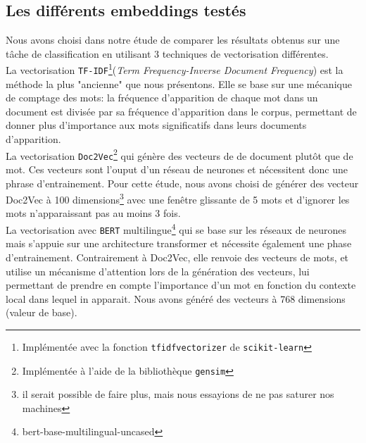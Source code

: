 \subsection{Les différents embeddings testés}
Nous avons choisi dans notre étude de comparer les résultats obtenus sur une tâche 
de classification en utilisant 3 techniques de vectorisation différentes.\\
\indent La vectorisation \texttt{TF-IDF}\footnote{Implémentée avec la fonction \texttt{tfidfvectorizer} de \texttt{scikit-learn}}(\textit{Term Frequency-Inverse Document Frequency})
est la méthode la plus "ancienne" que nous présentons. Elle se base sur une mécanique de comptage des mots:
la fréquence d'apparition de chaque mot dans un document est divisée par sa fréquence d'apparition dans le corpus,
permettant de donner plus d'importance aux mots significatifs dans leurs documents d'apparition.\\
\indent La vectorisation \texttt{Doc2Vec}\footnote{Implémentée à l'aide de la bibliothèque \texttt{gensim}} qui génère des vecteurs de de document plutôt que de mot. Ces vecteurs sont
l'ouput d'un réseau de neurones et nécessitent donc une phrase d'entrainement. Pour cette étude,
nous avons choisi de générer des vecteur Doc2Vec à 100 dimensions\footnote{il serait possible de faire plus, mais nous essayions de ne pas saturer nos machines}
avec une fenêtre glissante de 5 mots et d'ignorer les mots n'apparaissant pas au moins 3 fois.\\
\indent La vectorisation avec \texttt{BERT} multilingue\footnote{bert-base-multilingual-uncased} qui se base sur les réseaux de neurones mais s'appuie sur une 
architecture transformer et nécessite également une phase d'entrainement. Contrairement à
Doc2Vec, elle renvoie des vecteurs de mots, et utilise un mécanisme d'attention lors de
la génération des vecteurs, lui permettant de prendre en compte l'importance d'un mot en fonction du contexte local dans
lequel in apparait. Nous avons généré des vecteurs à 768 dimensions (valeur de base).





